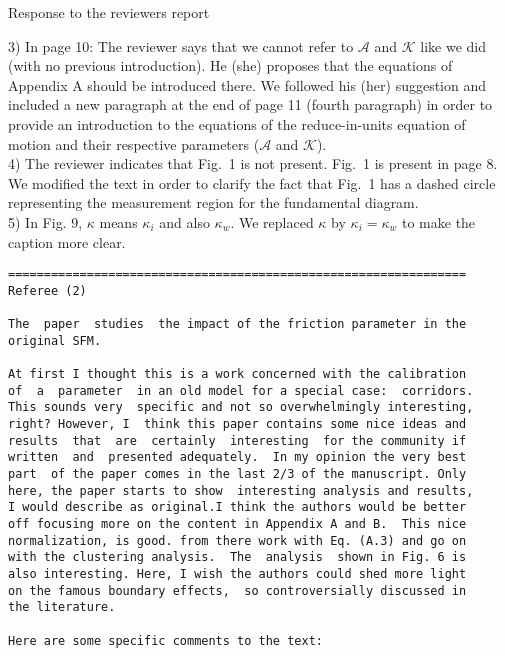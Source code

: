 \documentclass[a4paper,12pt]{letter}
\begin{document}
\begin{letter}{Response to the reviewers report}
{3) In page 10: The reviewer says that we cannot refer to $\mathcal{A}$ and $\mathcal{K}$ like we did (with no previous introduction). He (she) proposes that the equations of Appendix A should be introduced there. We followed his (her) suggestion and included a new paragraph at the end of page 11 (fourth paragraph) in order to provide an introduction to the equations of the reduce-in-units equation of motion and their respective parameters ($\mathcal{A}$ and $\mathcal{K}$).  \\


4) The reviewer indicates that Fig.~1 is not present. Fig.~1 is present in page 8.  \\

We modified the text in order to clarify the fact that Fig.~1 has a 
dashed circle representing the measurement region for the fundamental diagram. \\

5) In Fig. 9, $\kappa$ means $\kappa_i$ and also $\kappa_w$. We replaced $\kappa$ by $\kappa_i = \kappa_w$ to make the caption more clear.   


}

\newpage

\begin{verbatim}
================================================================
Referee (2)

The  paper  studies  the impact of the friction parameter in the 
original SFM.

At first I thought this is a work concerned with the calibration 
of  a  parameter  in an old model for a special case:  corridors. 
This sounds very  specific and not so overwhelmingly interesting,
right? However, I  think this paper contains some nice ideas and 
results  that  are  certainly  interesting  for the community if 
written  and  presented adequately.  In my opinion the very best 
part  of the paper comes in the last 2/3 of the manuscript. Only 
here, the paper starts to show  interesting analysis and results,
I would describe as original.I think the authors would be better
off focusing more on the content in Appendix A and B.  This nice 
normalization, is good. from there work with Eq. (A.3) and go on 
with the clustering analysis.  The  analysis  shown in Fig. 6 is 
also interesting. Here, I wish the authors could shed more light
on the famous boundary effects,  so controversially discussed in
the literature.

Here are some specific comments to the text:


\end{verbatim}
\end{letter}
\end{document}
